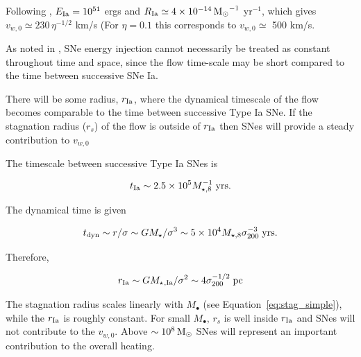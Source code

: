 \documentclass[usenatbib,fleqn]{mn2e}
\newcommand\gsim{\mathrel{\rlap{\lower4pt\hbox{\hskip1pt$\sim$}}
        \raise1pt\hbox{$>$}}}
\newcommand{\rs}{r_s}
\newcommand{\Mstar}{M_{\star}}
\newcommand{\Mseight}{M_{\star,8}}
\newcommand{\Mbh}[1][]{M_{\bullet#1}}
\newcommand{\rIa}{r_{\rm Ia}}
\newcommand{\vwO}{v_{w,0}}
\begin{document}
\begin{enumerate}
Following \citealt{ShcherbakovWong+:2014a}, $E_{\rm Ia}=10^{51}$ ergs
and $R_{\rm Ia}\simeq 4 \times 10^{-14} \,{\rm M_\odot}^{-1}$ yr$^{-1}$, which
gives $\vwO\simeq 230 \, \eta^{-1/2}$ km/s (For $\eta=0.1$ this
corresponds to $\vwO\simeq$ 500 km/s.

 As noted in \citealt{ShcherbakovWong+:2014a}, SNe energy injection
 cannot necessarily be treated as constant throughout time and space,
 since the flow time-scale may be short compared to the time between
 successive SNe Ia.

There will be some radius, $\rIa$, where the dynamical timescale of
the flow becomes comparable to the time between successive Type Ia
SNe.  If the stagnation radius ($\rs$) of the flow is outside of
$\rIa$ then SNes will provide a steady contribution to $\vwO$

The timescale between successive Type Ia SNes  is

\begin{align}
t_{\rm Ia} \sim 2.5 \times 10^5 \Mseight^{-1} \; {\rm yrs}.
\end{align}

The dynamical time is given

\begin{align}
  t_{\rm dyn} \sim r/\sigma \sim G \Mstar/\sigma^3 \sim 5 \times 10^4
  \Mseight \sigma_{200}^{-3} \; {\rm yrs}.
\end{align}

Therefore,

\begin{align}
  r_{\rm Ia} \sim G \Mstar{}_{,\rm Ia}/\sigma^2 \sim 4
  \sigma_{200}^{-1/2} \; {\rm pc}
\end{align}

The stagnation radius scales linearly with $\Mbh$ (see
Equation~\ref{eq:stag_simple}), while the $\rIa$ is roughly
constant. For small $\Mbh$, $\rs$ is well inside $\rIa$ and SNes will
not contribute to the $\vwO$.  Above $\sim10^8 \,{\rm M_\odot}$ SNes will
represent an important contribution to the overall heating.


\end{enumerate}
\end{document}
